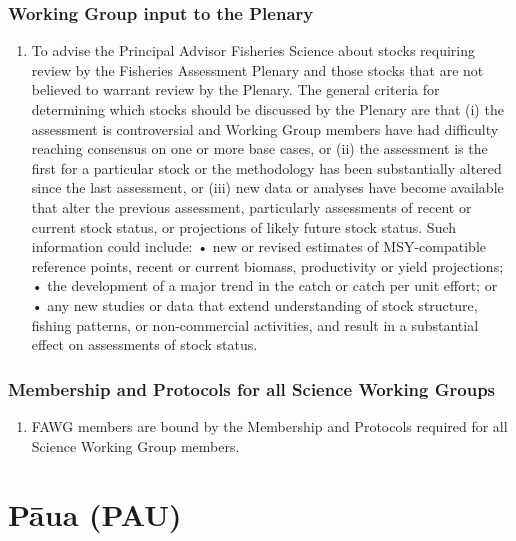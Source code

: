 \documentclass{mpi-plenary}
\newcounter{chapter}
\providecommand{\tightlist}{%
  \setlength{\itemsep}{0pt}\setlength{\parskip}{0pt}}
\theoremstyle{definition}
\theoremstyle{definition}
\theoremstyle{definition}
\theoremstyle{remark}
\begin{document}
\subsection{Working Group input to the
Plenary}\label{working-group-input-to-the-plenary}

\begin{enumerate}
\def\labelenumi{\arabic{enumi}.}
\setcounter{enumi}{15}
\tightlist
\item
  To advise the Principal Advisor Fisheries Science about stocks
  requiring review by the Fisheries Assessment Plenary and those stocks
  that are not believed to warrant review by the Plenary. The general
  criteria for determining which stocks should be discussed by the
  Plenary are that (i) the assessment is controversial and Working Group
  members have had difficulty reaching consensus on one or more base
  cases, or (ii) the assessment is the first for a particular stock or
  the methodology has been substantially altered since the last
  assessment, or (iii) new data or analyses have become available that
  alter the previous assessment, particularly assessments of recent or
  current stock status, or projections of likely future stock status.
  Such information could include: • new or revised estimates of
  MSY-compatible reference points, recent or current biomass,
  productivity or yield projections; • the development of a major trend
  in the catch or catch per unit effort; or • any new studies or data
  that extend understanding of stock structure, fishing patterns, or
  non-commercial activities, and result in a substantial effect on
  assessments of stock status.
\end{enumerate}

\subsection{Membership and Protocols for all Science Working
Groups}\label{membership-and-protocols-for-all-science-working-groups}

\begin{enumerate}
\def\labelenumi{\arabic{enumi}.}
\setcounter{enumi}{16}
\tightlist
\item
  FAWG members are bound by the Membership and Protocols required for
  all Science Working Group members.
\end{enumerate}

\chapter{Pāua (PAU)}\label{paua-pau}
\end{document}

